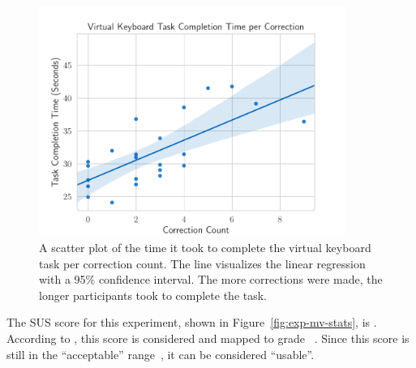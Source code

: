 \begin{figure}[H]
	\centering
	\includegraphics[width=10cm]{figures/evaluation/eval_exp_vk_ratio_scatter.pdf}
	\caption[Virtual keyboard task results]{A scatter plot of the time it took to complete the virtual keyboard task per correction count. The line visualizes the linear regression with a 95\% confidence interval. The more corrections were made, the longer participants took to complete the task.}\label{fig:eval-exp-vk-ratio-scatter}
\end{figure}

The \gls{SUS} score for this experiment, shown in Figure~\ref{fig:exp-mv-stats}, is \evalExpVkSusScore{}.
According to \citeauthor{Bangor.2009}, this score is considered \evalExpVkSusAdj{} and mapped to grade \evalExpVkSusGrade~\cite[120\psq]{Bangor.2009}. Since this score is still in the \enquote{acceptable} range~\cite[120\psq]{Bangor.2009}, it can be considered \enquote{usable}.

